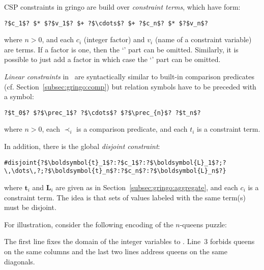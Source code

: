 CSP constraints in gringo are build over \emph{constraint terms}, which have form:
\begin{lstlisting}[numbers=none,escapechar=?]
?$c_1$? $* $?$v_1$? $+ ?$\cdots$? $+ ?$c_n$? $* $?$v_n$?
\end{lstlisting}
where $n>0$, and each $c_i$ (integer factor) and $v_i$ (name of a constraint variable) are terms.
If a factor is one, then the `' part can be omitted.
Similarly, it is possible to just add a factor in which case the `' part can be omitted.

\emph{Linear constraints} in \gringo\ are syntactically similar to built-in comparison predicates (cf. Section~\ref{subsec:gringo:comp})
but relation symbols have to be preceded with a \code{\$} symbol:
\begin{lstlisting}[numbers=none,escapechar=?]
?$t_0$? $?$\prec_1$? ?$\cdots$? $?$\prec_{n}$? ?$t_n$?
\end{lstlisting}
where $n>0$, each $\prec_i$ is a comparison predicate, and each $t_i$ is a constraint term.

In addition, there is the global \emph{disjoint constraint}:
\begin{lstlisting}[numbers=none,escapechar=?]
#disjoint{?$\boldsymbol{t}_1$?:?$c_1$?:?$\boldsymbol{L}_1$?;?\,\dots\,?;?$\boldsymbol{t}_n$?:?$c_n$?:?$\boldsymbol{L}_n$?}
\end{lstlisting}
where $\boldsymbol{t}_i$ and $\boldsymbol{L}_i$ are given as in Section~\ref{subsec:gringo:aggregate},
and each $c_i$ is a constraint term.
%
The idea is that sets of values labeled with the same term(s) must be disjoint.

\begin{example}\label{ex:csp:queens1}
For illustration,
consider the following encoding of the $n$-queens puzzle:


The first line fixes the domain of the integer variables
 to .
Line~3 forbids queens on the same columns and the last two lines address queens on the same diagonals.
\end{example}

